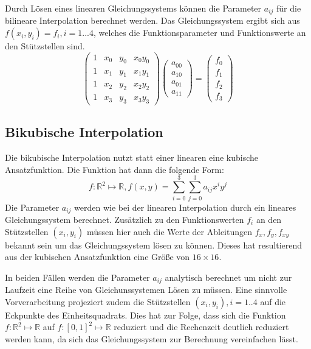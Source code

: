 Durch L\"osen eines linearen Gleichungssystems k\"onnen die Parameter \(a_{ij} \) f\"ur die bilineare Interpolation berechnet werden. Das Gleichungssystem ergibt sich aus \( f(x_i, y_i)=f_i, i=1...4 \), welches die Funktionsparameter und Funktionswerte an den St\"utzstellen sind.
\begin{equation*}
 \begin{pmatrix}
  1 & x_0 & y_0 & x_0y_0 \\
  1 & x_1 & y_1 & x_1y_1 \\
  1 & x_2 & y_2 & x_2y_2 \\
  1 & x_3 & y_3 & x_3y_3
 \end{pmatrix}
 \begin{pmatrix}
  a_{00} \\ a_{10} \\ a_{01} \\ a_{11}
 \end{pmatrix}
 =
 \begin{pmatrix}
  f_0 \\ f_1 \\ f_2 \\ f_3
 \end{pmatrix}
\end{equation*}

\subsection*{Bikubische Interpolation}
Die bikubische Interpolation nutzt statt einer linearen eine kubische Ansatzfunktion. Die Funktion hat dann die folgende Form:
\begin{equation*}
 f: \mathbb{R}^2\mapsto\mathbb{R}, f(x, y)=\sum_{i=0}^3 \sum_{j=0}^3 a_{ij}x^iy^j
\end{equation*}
Die Parameter \(a_{ij} \) werden wie bei der linearen Interpolation durch ein lineares Gleichungssystem berechnet. Zus\"atzlich zu den Funktionswerten \(f_i\) an den St\"utzstellen \( (x_i, y_i) \) m\"ussen hier auch die Werte der Ableitungen \( f_x, f_y, f_{xy} \) bekannt sein um das Gleichungssystem l\"osen zu k\"onnen. Dieses hat resultierend aus der kubischen Ansatzfunktion eine Gr\"o\ss{}e von \( 16\times 16 \). 

In beiden F\"allen werden die Parameter \(a_{ij} \) analytisch berechnet um nicht zur Laufzeit eine Reihe von Gleichunssystemen L\"osen zu m\"ussen. Eine sinnvolle Vorverarbeitung projeziert zudem die St\"utzstellen \( (x_i, y_i), i=1..4 \) auf die Eckpunkte des Einheitsquadrats. Dies hat zur Folge, dass sich die Funktion \( f: \mathbb{R}^2\mapsto\mathbb{R} \) auf \( f: [0, 1]^2\mapsto\mathbb{R} \) reduziert und die Rechenzeit deutlich reduziert werden kann, da sich das Gleichungssystem zur Berechnung vereinfachen l\"asst.

